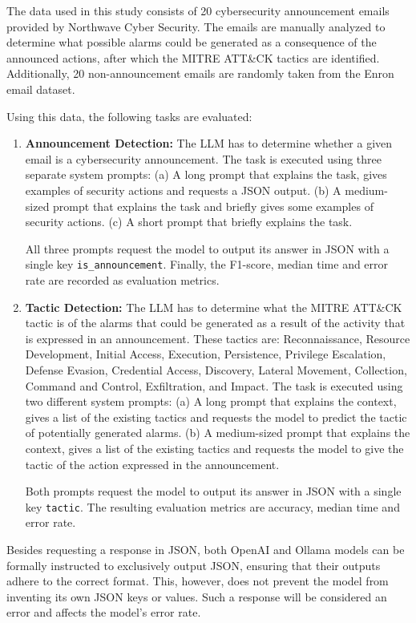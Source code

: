 The data used in this study consists of 20 cybersecurity announcement emails provided by Northwave Cyber Security.
The emails are manually analyzed to determine what possible alarms could be generated as a consequence of the announced
actions, after which the MITRE ATT\&CK tactics are identified.
Additionally, 20 non-announcement emails are randomly taken from the Enron email dataset.

Using this data, the following tasks are evaluated:
\begin{enumerate}
    \item \textbf{Announcement Detection:}
    The LLM has to determine whether a given email is a cybersecurity announcement.
    The task is executed using three separate system prompts:
    (a) A long prompt that explains the task, gives examples of security actions and requests a JSON output.
    (b) A medium-sized prompt that explains the task and briefly gives some examples of security actions.
    (c) A short prompt that briefly explains the task.

    All three prompts request the model to output its answer in JSON with a single key \texttt{is\_announcement}.
    Finally, the F1-score, median time and error rate are recorded as evaluation metrics.

    \item \textbf{Tactic Detection:}
    The LLM has to determine what the MITRE ATT\&CK tactic is of the alarms that could be generated as a result of the
    activity that is expressed in an announcement.
    These tactics are: Reconnaissance, Resource Development, Initial Access, Execution, Persistence, Privilege
    Escalation, Defense Evasion, Credential Access, Discovery, Lateral Movement, Collection, Command and Control,
    Exfiltration, and Impact.
    The task is executed using two different system prompts:
    (a) A long prompt that explains the context, gives a list of the existing tactics and requests the model to predict
    the tactic of potentially generated alarms.
    (b) A medium-sized prompt that explains the context, gives a list of the existing tactics and requests the model to
    give the tactic of the action expressed in the announcement.

    Both prompts request the model to output its answer in JSON with a single key \texttt{tactic}.
    The resulting evaluation metrics are accuracy, median time and error rate.
\end{enumerate}

Besides requesting a response in JSON, both OpenAI and Ollama models can be formally instructed to exclusively output
JSON, ensuring that their outputs adhere to the correct format.
This, however, does not prevent the model from inventing its own JSON keys or values.
Such a response will be considered an error and affects the model's error rate.

